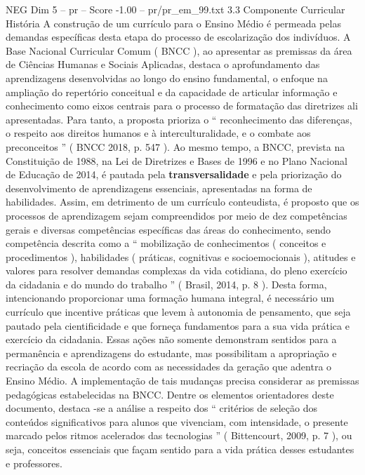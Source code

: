 \begin{textsample}{NEG Dim 5 – pr – Score -1.00 – pr/pr\_em\_99.txt}  \label{ex:f5_neg_231}
3.3 Componente Curricular História A construção de um currículo para o Ensino Médio é permeada pelas demandas específicas desta etapa do processo de escolarização dos indivíduos.
A Base Nacional Curricular Comum ( BNCC ), ao apresentar as premissas da área de Ciências Humanas e Sociais Aplicadas, destaca o aprofundamento das aprendizagens desenvolvidas ao longo do ensino fundamental, o enfoque na ampliação do repertório conceitual e da capacidade de articular informação e conhecimento como eixos centrais para o processo de formatação das diretrizes ali apresentadas.
Para tanto, a proposta prioriza o “ reconhecimento das diferenças, o respeito aos direitos humanos e à interculturalidade, e o combate aos preconceitos ” ( BNCC 2018, p. 547 ).
Ao mesmo tempo, a BNCC, prevista na Constituição de 1988, na Lei de Diretrizes e Bases de 1996 e no Plano Nacional de Educação de 2014, é pautada pela \textbf{transversalidade} e pela priorização do desenvolvimento de aprendizagens essenciais, apresentadas na forma de habilidades.
Assim, em detrimento de um currículo conteudista, é proposto que os processos de aprendizagem sejam compreendidos por meio de dez competências gerais e diversas competências específicas das áreas do conhecimento, sendo competência descrita como a “ mobilização de conhecimentos ( conceitos e procedimentos ), habilidades ( práticas, cognitivas e socioemocionais ), atitudes e valores para resolver demandas complexas da vida cotidiana, do pleno exercício da cidadania e do mundo do trabalho ” ( Brasil, 2014, p. 8 ).
Desta forma, intencionando proporcionar uma formação humana integral, é necessário um currículo que incentive práticas que levem à autonomia de pensamento, que seja pautado pela cientificidade e que forneça fundamentos para a sua vida prática e exercício da cidadania.
Essas ações não somente demonstram sentidos para a permanência e aprendizagens do estudante, mas possibilitam a apropriação e recriação da escola de acordo com as necessidades da geração que adentra o Ensino Médio.
A implementação de tais mudanças precisa considerar as premissas pedagógicas estabelecidas na BNCC.
Dentre os elementos orientadores deste documento, destaca -se a análise a respeito dos “ critérios de seleção dos conteúdos significativos para alunos que vivenciam, com intensidade, o presente marcado pelos ritmos acelerados das tecnologias ” ( Bittencourt, 2009, p. 7 ), ou seja, conceitos essenciais que façam sentido para a vida prática desses estudantes e professores.

\end{textsample}
